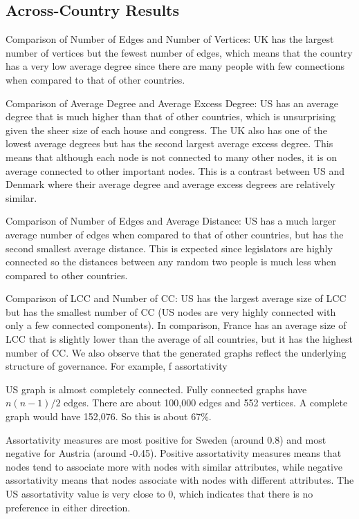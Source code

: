 \documentclass[12pt]{article}
\begin{document}
\begin{multicols*}{2}
\subsection{Across-Country Results}

Comparison of Number of Edges and Number of Vertices: UK has the largest number of vertices but the fewest number of edges, which means that the country has a very low average degree since there are many people with few connections when compared to that of other countries. 

Comparison of Average Degree and Average Excess Degree: US has an average degree that is much higher than that of other countries, which is unsurprising given the sheer size of each house and congress. The UK also has one of the lowest average degrees but has the second largest average excess degree. This means that although each node is not connected to many other nodes, it is on average connected to other important nodes. This is a contrast between US and Denmark where their average degree and average excess degrees are relatively similar. 

Comparison of Number of Edges and Average Distance: US has a much larger average number of edges when compared to that of other countries, but has the second smallest average distance. This is expected since legislators are highly connected so the distances between any random two people is much less when compared to other countries.

Comparison of LCC and Number of CC: US has the largest average size of LCC but has the smallest number of CC (US nodes are very highly connected with only a few connected components). In comparison, France has an average size of LCC that is slightly lower than the average of all countries, but it has the highest number of CC. We also observe that the generated graphs reflect the underlying structure of governance. For example, f assortativity 

US graph is almost completely connected. Fully connected graphs have $n(n-1)/2$ edges. There are about 100,000 edges and 552 vertices. A complete graph would have 152,076. So this is about 67\%.

Assortativity measures are most positive for Sweden (around 0.8) and most negative for Austria (around -0.45). Positive assortativity measures means that nodes tend to associate more with nodes with similar attributes, while negative assortativity means that nodes associate with nodes with different attributes. The US assortativity value is very close to 0, which indicates that there is no preference in either direction. 


\end{multicols*}
\end{document}
